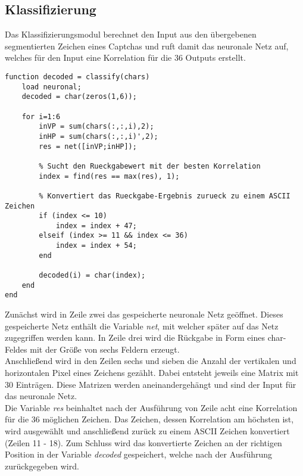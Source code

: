 \subsection{Klassifizierung}
Das Klassifizierungsmodul berechnet den Input aus den übergebenen segmentierten Zeichen eines Captchas und ruft damit das neuronale Netz auf, welches für den Input eine Korrelation für die 36 Outputs erstellt.
\begin{lstlisting}
function decoded = classify(chars)
    load neuronal;
    decoded = char(zeros(1,6));
    
    for i=1:6
        inVP = sum(chars(:,:,i),2);
        inHP = sum(chars(:,:,i)',2);
        res = net([inVP;inHP]);
   
        % Sucht den Rueckgabewert mit der besten Korrelation
        index = find(res == max(res), 1);
        
        % Konvertiert das Rueckgabe-Ergebnis zurueck zu einem ASCII Zeichen
        if (index <= 10)
            index = index + 47;
        elseif (index >= 11 && index <= 36)
            index = index + 54;
        end

        decoded(i) = char(index);
    end
end
\end{lstlisting}
Zunächst wird in Zeile zwei das gespeicherte neuronale Netz geöffnet. Dieses gespeicherte Netz enthält die Variable \textit{net}, mit welcher später auf das Netz zugegriffen werden kann. In Zeile drei wird die Rückgabe in Form eines char-Feldes mit der Größe von sechs Feldern erzeugt.\\
Anschließend wird in den Zeilen sechs und sieben die Anzahl der vertikalen und horizontalen Pixel eines Zeichens gezählt. Dabei entsteht jeweils eine Matrix mit 30 Einträgen. Diese Matrizen werden aneinandergehängt und sind der Input für das neuronale Netz.\\
Die Variable \textit{res} beinhaltet nach der Ausführung von Zeile acht eine Korrelation für die 36 möglichen Zeichen. Das Zeichen, dessen Korrelation am höchsten ist, wird ausgewählt und anschließend zurück zu einem ASCII Zeichen konvertiert (Zeilen 11 - 18). Zum Schluss wird das konvertierte Zeichen an der richtigen Position in der Variable \textit{decoded} gespeichert, welche nach der Ausführung zurückgegeben wird. 

\newpage
